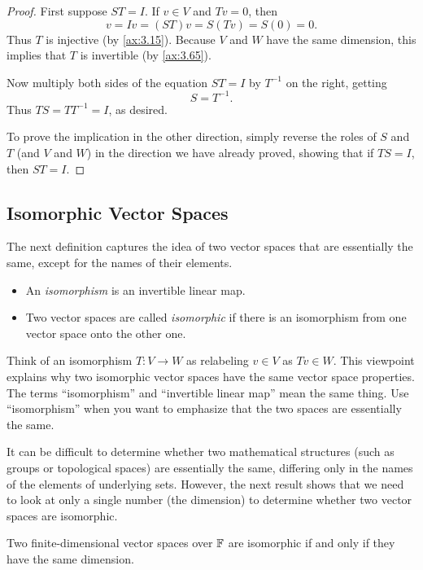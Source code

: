 \begin{proof}
First suppose $ST=I$. If $v\in V$ and $Tv=0$, then
\[ v = Iv = (ST)v = S(Tv) = S(0) = 0. \]
Thus $T$ is injective (by \ref{ax:3.15}). Because $V$ and $W$ have the same
dimension, this implies that $T$ is invertible (by \ref{ax:3.65}).

Now multiply both sides of the equation $ST=I$ by $T^{-1}$ on the right,
getting
\[ S = T^{-1}. \]
Thus $TS=TT^{-1}=I$, as desired.

To prove the implication in the other direction, simply reverse the roles of
$S$ and $T$ (and $V$ and $W$) in the direction we have already proved, showing
that if $TS=I$, then $ST=I$.
\end{proof}

\subsection{Isomorphic Vector Spaces}

The next definition captures the idea of two vector spaces that are essentially
the same, except for the names of their elements.

\begin{definition}\label{ax:3.69}\leavevmode
\begin{itemize}
\item An \emph{isomorphism} is an invertible linear map.
\item Two vector spaces are called \emph{isomorphic} if there is an isomorphism
  from one vector space onto the other one.
\end{itemize}
\end{definition}

Think of an isomorphism $T\colon V\to W$ as relabeling $v\in V$ as $Tv\in W$.
This viewpoint explains why two isomorphic vector spaces have the same vector
space properties. The terms ``isomorphism'' and ``invertible linear map'' mean
the same thing. Use ``isomorphism'' when you want to emphasize that the two
spaces are essentially the same.

It can be difficult to determine whether two mathematical structures (such as
groups or topological spaces) are essentially the same, differing only in the
names of the elements of underlying sets. However, the next result shows that
we need to look at only a single number (the dimension) to determine whether two
vector spaces are isomorphic.

\begin{result}\label{ax:3.70}
Two finite-dimensional vector spaces over $\mathbb{F}$ are isomorphic if and only if
they have the same dimension.
\end{result}

